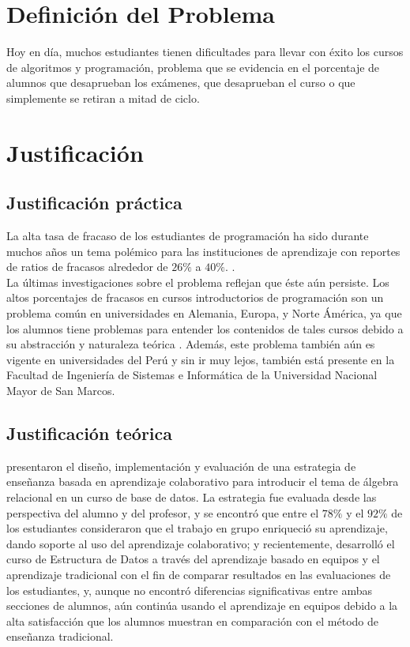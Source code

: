 \section{Definición del Problema}
 Hoy en día, muchos estudiantes tienen dificultades para llevar con éxito los cursos de algoritmos y programación, problema que se evidencia en el porcentaje de alumnos que desaprueban los exámenes, que desaprueban el curso o que simplemente se retiran a mitad de ciclo.

\section{Justificación}
\subsection{Justificación práctica}
La alta tasa de fracaso de los estudiantes de programación ha sido durante muchos años un tema polémico para las instituciones de aprendizaje con reportes de ratios de fracasos alrededor de $26\%$ a $40\%$. \cite{sheard_our_1998,truong_web_2003,lang_seven_2007,han_enhancement_2010}.\\

La últimas investigaciones sobre el problema reflejan que éste aún persiste. Los altos porcentajes de fracasos en cursos introductorios de programación son un problema común en universidades en Alemania, Europa, y Norte Ámérica, ya que los alumnos tiene problemas para entender los contenidos de tales cursos debido a su abstracción y naturaleza teórica \cite{knobelsdorf_teaching_2014}. Además, este problema también aún es vigente en universidades del Perú y sin ir muy lejos, también está presente en la Facultad de Ingeniería de Sistemas e Informática de la Universidad Nacional Mayor de San Marcos.


\subsection{Justificación teórica}
 presentaron el diseño, implementación y evaluación de una estrategia de enseñanza basada en aprendizaje colaborativo para introducir el tema de álgebra relacional en un curso de base de datos. La estrategia fue evaluada desde las perspectiva del alumno y del profesor, y se encontró que entre el $78\%$ y el $92\%$ de los estudiantes consideraron que el trabajo en grupo enriqueció su aprendizaje, dando soporte al uso del aprendizaje colaborativo; y recientemente,  desarrolló el curso de Estructura de Datos a través del aprendizaje basado en equipos y el aprendizaje tradicional con el fin de comparar resultados en las evaluaciones de los estudiantes, y, aunque no encontró diferencias significativas entre ambas secciones de alumnos, aún continúa usando el aprendizaje en equipos debido a la alta satisfacción que los alumnos muestran en comparación con el método de enseñanza tradicional.\\


